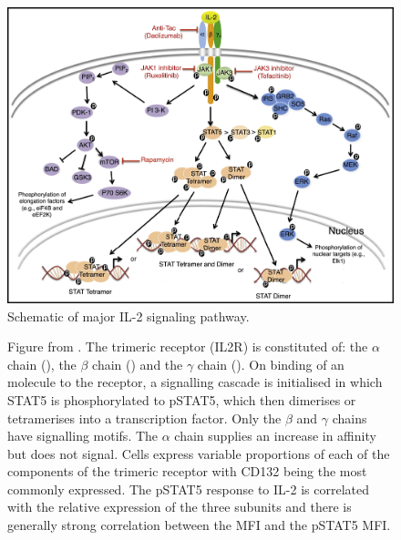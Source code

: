 \begin{figure}[h]
\centering
\includegraphics[scale=.9]{figures/IL2-pathway.jpg}
{ Schematic of major IL-2 signaling pathway. }
{
    Figure from \citet{Liao:2013jt}.
    The trimeric  receptor (IL2R) is constituted of: the $\alpha$ chain  (), the $\beta$ chain  ()
    and the $\gamma$ chain  ().
    On binding of an  molecule to the receptor, a signalling cascade is initialised in which STAT5 is phosphorylated to pSTAT5, which then dimerises or tetramerises into a transcription factor.
    Only the $\beta$ and $\gamma$ chains have signalling motifs.
    The $\alpha$ chain supplies an increase in affinity but does not signal.
    Cells express variable proportions of each of the components of the trimeric receptor with CD132 being the most commonly expressed.
    The pSTAT5 response to IL-2 is correlated with the relative expression of the three subunits and there is generally strong correlation between the  MFI and the pSTAT5 MFI.

}
\end{figure}

